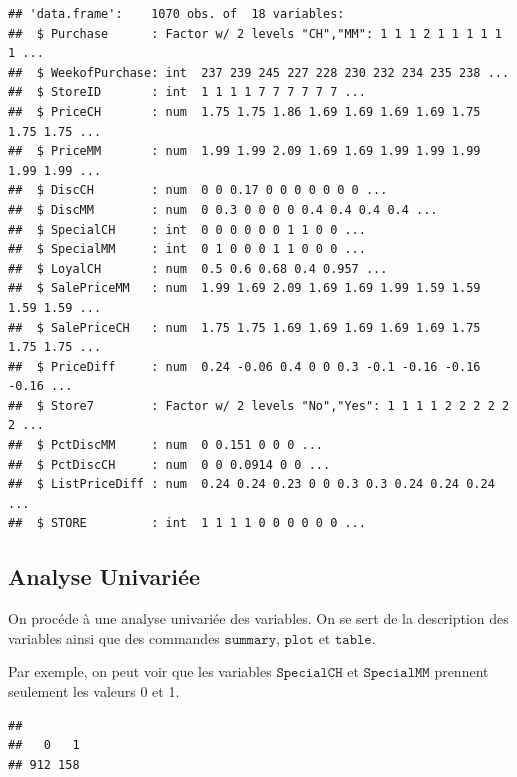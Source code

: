 \documentclass[]{article}
\newenvironment{Shaded}{\begin{snugshade}}{\end{snugshade}}
\newcommand{\KeywordTok}[1]{\textcolor[rgb]{0.13,0.29,0.53}{\textbf{#1}}}
\newcommand{\NormalTok}[1]{#1}
\newcommand{\OperatorTok}[1]{\textcolor[rgb]{0.81,0.36,0.00}{\textbf{#1}}}
\begin{document}
\begin{verbatim}
## 'data.frame':    1070 obs. of  18 variables:
##  $ Purchase      : Factor w/ 2 levels "CH","MM": 1 1 1 2 1 1 1 1 1 1 ...
##  $ WeekofPurchase: int  237 239 245 227 228 230 232 234 235 238 ...
##  $ StoreID       : int  1 1 1 1 7 7 7 7 7 7 ...
##  $ PriceCH       : num  1.75 1.75 1.86 1.69 1.69 1.69 1.69 1.75 1.75 1.75 ...
##  $ PriceMM       : num  1.99 1.99 2.09 1.69 1.69 1.99 1.99 1.99 1.99 1.99 ...
##  $ DiscCH        : num  0 0 0.17 0 0 0 0 0 0 0 ...
##  $ DiscMM        : num  0 0.3 0 0 0 0 0.4 0.4 0.4 0.4 ...
##  $ SpecialCH     : int  0 0 0 0 0 0 1 1 0 0 ...
##  $ SpecialMM     : int  0 1 0 0 0 1 1 0 0 0 ...
##  $ LoyalCH       : num  0.5 0.6 0.68 0.4 0.957 ...
##  $ SalePriceMM   : num  1.99 1.69 2.09 1.69 1.69 1.99 1.59 1.59 1.59 1.59 ...
##  $ SalePriceCH   : num  1.75 1.75 1.69 1.69 1.69 1.69 1.69 1.75 1.75 1.75 ...
##  $ PriceDiff     : num  0.24 -0.06 0.4 0 0 0.3 -0.1 -0.16 -0.16 -0.16 ...
##  $ Store7        : Factor w/ 2 levels "No","Yes": 1 1 1 1 2 2 2 2 2 2 ...
##  $ PctDiscMM     : num  0 0.151 0 0 0 ...
##  $ PctDiscCH     : num  0 0 0.0914 0 0 ...
##  $ ListPriceDiff : num  0.24 0.24 0.23 0 0 0.3 0.3 0.24 0.24 0.24 ...
##  $ STORE         : int  1 1 1 1 0 0 0 0 0 0 ...
\end{verbatim}

\hypertarget{analyse-univariuxe9e}{%
\subsection{Analyse Univariée}\label{analyse-univariuxe9e}}

On procéde à une analyse univariée des variables. On se sert de la
description des variables ainsi que des commandes \(\texttt{summary}\),
\(\texttt{plot}\) et \(\texttt{table}\).

Par exemple, on peut voir que les variables \(\texttt{SpecialCH}\) et
\(\texttt{SpecialMM}\) prennent seulement les valeurs 0 et 1.

\begin{Shaded}
\end{Shaded}

\begin{verbatim}
## 
##   0   1 
## 912 158
\end{verbatim}

\begin{Shaded}
\end{Shaded}
\end{document}
